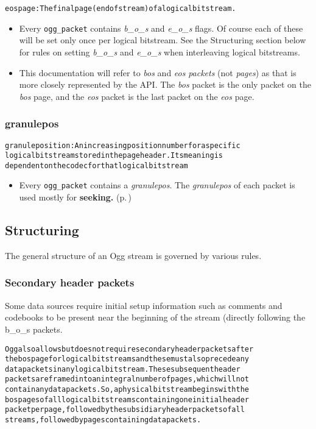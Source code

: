 \small\begin{alltt}   eos page: The final page (end of stream) of a logical bitstream.
\end{alltt}\normalsize 


\begin{itemize}
\item Every {\tt ogg\_\-packet} contains {\em b\_\-o\_\-s\/} and {\em e\_\-o\_\-s\/} flags. Of course each of these will be set only once per logical bitstream. See the Structuring section below for rules on setting {\em b\_\-o\_\-s\/} and {\em e\_\-o\_\-s\/} when interleaving logical bitstreams.\item This documentation will refer to {\em bos\/} and {\em eos\/} {\em packets\/} (not {\em pages\/}) as that is more closely represented by the API. The {\em bos\/} packet is the only packet on the {\em bos\/} page, and the {\em eos\/} packet is the last packet on the {\em eos\/} page.\end{itemize}
\subsubsection{granulepos}\label{granulepos}
\small\begin{alltt}
   granule position: An increasing position number for a specific
      logical bitstream stored in the page header.  Its meaning is
      dependent on the codec for that logical bitstream
\end{alltt}\normalsize 


\begin{itemize}
\item Every {\tt ogg\_\-packet} contains a {\em granulepos\/}. The {\em granulepos\/} of each packet is used mostly for {\bf seeking. }{\rm (p.\,\pageref{group__seek__api})}\end{itemize}
\subsection{Structuring}\label{Structuring}
The general structure of an Ogg stream is governed by various rules.\subsubsection{Secondary header packets}\label{secondaries}
Some data sources require initial setup information such as comments and codebooks to be present near the beginning of the stream (directly following the b\_\-o\_\-s packets.

\small\begin{alltt}
   Ogg also allows but does not require secondary header packets after
   the bos page for logical bitstreams and these must also precede any
   data packets in any logical bitstream.  These subsequent header
   packets are framed into an integral number of pages, which will not
   contain any data packets.  So, a physical bitstream begins with the
   bos pages of all logical bitstreams containing one initial header
   packet per page, followed by the subsidiary header packets of all
   streams, followed by pages containing data packets.
\end{alltt}\normalsize 


